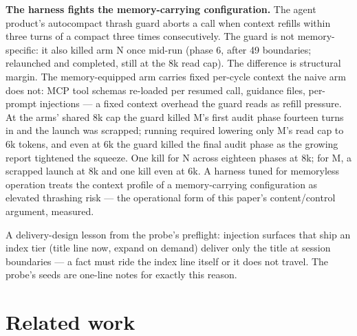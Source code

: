 \documentclass[11pt]{article}
\begin{document}
\textbf{The harness fights the memory-carrying configuration.} The agent
product's autocompact thrash guard aborts a call when context refills
within three turns of a compact three times consecutively. The guard
is not memory-specific: it also killed arm N once mid-run (phase 6,
after 49 boundaries; relaunched and completed, still at the 8k read
cap). The difference is structural margin. The memory-equipped arm
carries fixed per-cycle context the naive arm does not: MCP tool
schemas re-loaded per resumed call, guidance files, per-prompt
injections --- a fixed context overhead the guard reads as refill
pressure. At the arms' shared 8k cap the guard killed M's first audit
phase fourteen turns in and the launch was scrapped; running required
lowering only M's read cap to 6k tokens, and even at 6k the guard
killed the final audit phase as the growing report tightened the
squeeze. One kill for N across eighteen phases at 8k; for M, a
scrapped launch at 8k and one kill even at 6k. A harness tuned for
memoryless operation treats the context profile of a memory-carrying
configuration as elevated thrashing risk --- the operational form of
this paper's content/control argument, measured.

A delivery-design lesson from the probe's preflight: injection
surfaces that ship an index tier (title line now, expand on demand)
deliver only the title at session boundaries --- a fact must ride the
index line itself or it does not travel. The probe's seeds are
one-line notes for exactly this reason.

\section{Related work}
\label{sec:related}
\end{document}
